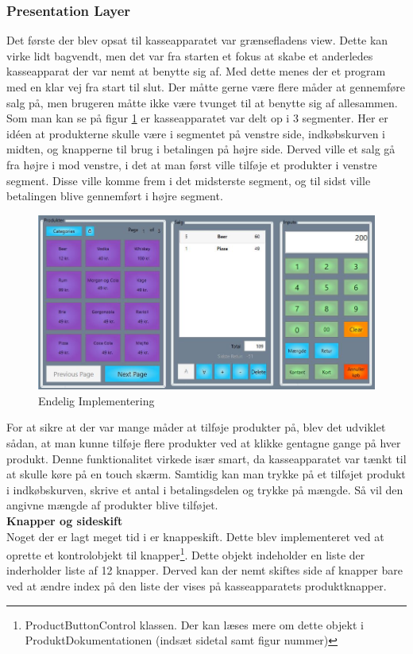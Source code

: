 \subsubsection{Presentation Layer}

Det første der blev opsat til kasseapparatet var grænsefladens view. Dette kan virke lidt bagvendt, men det var fra starten et fokus at skabe et anderledes kasseapparat der var nemt at benytte sig af. Med dette menes der et program med en klar vej fra start til slut. Der måtte gerne være flere måder at gennemføre salg på, men brugeren måtte ikke være tvunget til at benytte sig af allesammen.
Som man kan se på figur \ref{fig:sub2}	 er kasseapparatet var delt op i 3 segmenter. Her er idéen at produkterne skulle være i segmentet på venstre side, indkøbskurven i midten, og knapperne til brug i betalingen på højre side. Derved ville et salg gå fra højre i mod venstre, i det at man først ville tilføje et produkter i venstre segment. Disse ville komme frem i det midsterste segment, og til sidst ville betalingen blive gennemført i højre segment. 

\begin{figure}[H]
	\centering
	\includegraphics[width=0.9\linewidth]{Projektbeskrivelse/DesignOgImplementering/pics/GUI}
	\caption{Endelig Implementering}
	\label{fig:sub2}
\end{figure}

For at sikre at der var mange måder at tilføje produkter på, blev det udviklet sådan, at man kunne tilføje flere produkter ved at klikke gentagne gange på hver produkt. Denne funktionalitet virkede især smart, da kasseapparatet var tænkt til at skulle køre på en touch skærm. Samtidig kan man trykke på et tilføjet produkt i indkøbskurven, skrive et antal i betalingsdelen og trykke på mængde. Så vil den angivne mængde af produkter blive tilføjet.  \\

\textbf{Knapper og sideskift} \\
Noget der er lagt meget tid i er knappeskift. Dette blev implementeret ved at oprette et kontrolobjekt til knapper\footnote{ProductButtonControl klassen. Der kan læses mere om dette objekt i ProduktDokumentationen (indsæt sidetal samt figur nummer)}. Dette objekt indeholder en liste der inderholder liste af 12 knapper. Derved kan der nemt skiftes side af knapper bare ved at ændre index på den liste der vises på kasseapparatets produktknapper.